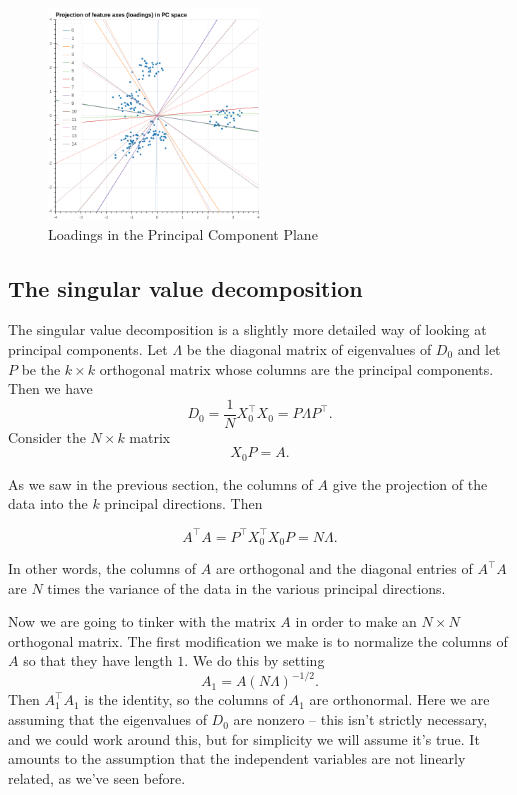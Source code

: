 \documentclass[
  11pt,
  letterpaper,
]{scrbook}
\theoremstyle{plain}
\theoremstyle{plain}
\theoremstyle{remark}
\begin{document}
\begin{figure}

{\centering \includegraphics[width=0.5\textwidth,height=\textheight]{chapters/img/loading.png}

}

\caption{\label{fig-loadings}Loadings in the Principal Component Plane}

\end{figure}

\hypertarget{sec-svd}{%
\subsection{The singular value decomposition}\label{sec-svd}}

The singular value decomposition is a slightly more detailed way of
looking at principal components. Let \(\Lambda\) be the diagonal matrix
of eigenvalues of \(D_{0}\) and let \(P\) be the \(k\times k\)
orthogonal matrix whose columns are the principal components. Then we
have \[
D_{0} =\frac{1}{N}X_{0}^{\intercal}X_{0}= P\Lambda P^{\intercal}.
\] Consider the \(N\times k\) matrix \[
X_{0}P = A.
\]

As we saw in the previous section, the columns of \(A\) give the
projection of the data into the \(k\) principal directions. Then

\[A^{\intercal}A=P^{\intercal}X_{0}^{\intercal}X_{0}P=N\Lambda.\]

In other words, the columns of \(A\) are orthogonal and the diagonal
entries of \(A^{\intercal}A\) are \(N\) times the variance of the data
in the various principal directions.

Now we are going to tinker with the matrix \(A\) in order to make an
\(N\times N\) orthogonal matrix. The first modification we make is to
normalize the columns of \(A\) so that they have length \(1\). We do
this by setting \[
A_{1} = A(N\Lambda)^{-1/2}.
\] Then \(A_{1}^{\intercal}A_{1}\) is the identity, so the columns of
\(A_{1}\) are orthonormal. Here we are assuming that the eigenvalues of
\(D_{0}\) are nonzero -- this isn't strictly necessary, and we could
work around this, but for simplicity we will assume it's true. It
amounts to the assumption that the independent variables are not
linearly related, as we've seen before.
\end{document}
